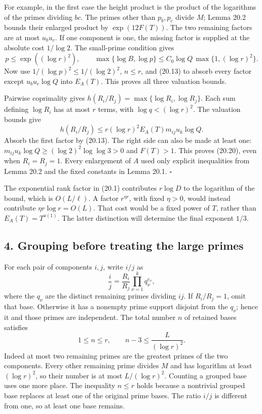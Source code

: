 \documentclass[
  11pt,
  a4paper,
]{article}
\newcounter{none} %
\begin{document}
For example, in the first case the height product is the product of the
logarithms of the primes dividing \(bc\). The primes other than
\(p_b,p_c\) divide \(M\); Lemma 20.2 bounds their enlarged product by
\(\exp(12F(T))\). The two remaining factors are at most \(u_bu_c\). If
one component is one, the missing factor is supplied at the absolute
cost \(1/\log2\). The small-prime condition gives \[
 p\le\exp((\log r)^2),\qquad
 \max\{\log B,\log p\}
 \le C_0\log Q\,\max\{1,(\log r)^2\}.
 \] Now use \(1/(\log p)^2\le1/(\log2)^2\), \(n\le r\), and (20.13) to
absorb every factor except \(u_bu_c\log Q\) into \(E_A(T)\). This proves
all three valuation bounds.

Pairwise coprimality gives \(h(R_i/R_j)=\max\{\log R_i,\log R_j\}\).
Each sum defining \(\log R_i\) has at most \(r\) terms, with
\(\log q<(\log r)^2\). The valuation bounds give \[
 h(R_i/R_j)\le
 r(\log r)^2 E_A(T)m_{ij}u_k\log Q.
 \] Absorb the first factor by (20.13). The right side can also be made
at least one: \(m_{ij}u_k\log Q\ge(\log2)^2\log\log3>0\) and \(F(T)>1\).
This proves (20.20), even when \(R_i=R_j=1\). Every enlargement of \(A\)
used only explicit inequalities from Lemma 20.2 and the fixed constants
in Lemma 20.1. \(\square\)

The exponential rank factor in (20.1) contributes \(r\log D\) to the
logarithm of the bound, which is \(O(L/\ell)\). A factor \(r^{\eta r}\),
with fixed \(\eta>0\), would instead contribute \(\eta r\log r=O(L)\).
That cost would be a fixed power of \(T\), rather than
\(E_A(T)=T^{o(1)}\). The latter distinction will determine the final
exponent \(1/3\).

\subsection{4. Grouping before treating the large
primes}\label{grouping-before-treating-the-large-primes}

For each pair of components \(i,j\), write \(i/j\) as \[
 \frac{i}{j}=\frac{R_i}{R_j}\prod_{\nu=1}^k q_\nu^{e_\nu},
 \tag{20.21}
\] where the \(q_\nu\) are the distinct remaining primes dividing
\(ij\). If \(R_i/R_j=1\), omit that base. Otherwise it has a nonempty
prime support disjoint from the \(q_\nu\); hence it and those primes are
independent. The total number \(n\) of retained bases satisfies \[
 1\le n\le r,\qquad n-3\le\frac L{(\log r)^2}.
 \tag{20.22}
\] Indeed at most two remaining primes are the greatest primes of the
two components. Every other remaining prime divides \(M\) and has
logarithm at least \((\log r)^2\), so their number is at most
\(L/(\log r)^2\). Counting a grouped base uses one more place. The
inequality \(n\le r\) holds because a nontrivial grouped base replaces
at least one of the original prime bases. The ratio \(i/j\) is different
from one, so at least one base remains.
\end{document}
